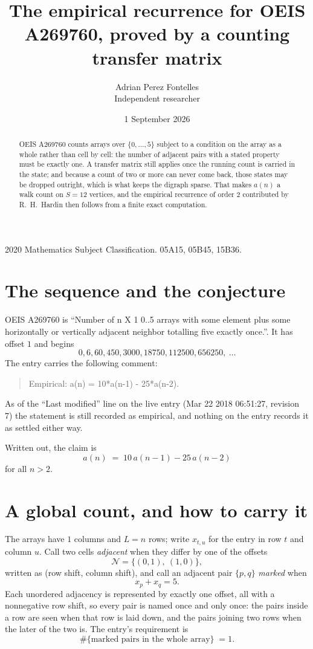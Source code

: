 \documentclass[11pt,a4paper]{article}
\title{The empirical recurrence for OEIS A269760, proved by a counting transfer matrix}
\author{Adrian Perez Fontelles\\ \small Independent researcher}
\date{1 September 2026}
\theoremstyle{plain}
\theoremstyle{definition}
\begin{document}
\maketitle

\begin{abstract}
OEIS A269760 counts arrays over $\{0,\dots,5\}$ subject to a condition on the array as a
whole rather than cell by cell: the number of adjacent pairs with a stated property must be
exactly one. A transfer matrix still applies once the running count is carried in the state; and
because a count of two or more can never come back, those states may be dropped outright,
which is what keeps the digraph sparse. That makes $a(n)$ a walk count on $S=12$ vertices,
and the empirical recurrence of order $2$ contributed by R.~H.~Hardin then follows from
a finite exact computation.
\end{abstract}

\noindent\small 2020 Mathematics Subject Classification. 05A15, 05B45, 15B36.\normalsize

\section{The sequence and the conjecture}

OEIS A269760 is ``Number of n X 1 0..5 arrays with some element plus some horizontally or vertically adjacent neighbor totalling five exactly once.''. It has offset $1$ and begins
\[
0, 6, 60, 450, 3000, 18750, 112500, 656250,\ \dots
\]
The entry carries the following comment:
\begin{quote}\small
Empirical: a(n) = 10*a(n-1) - 25*a(n-2).
\end{quote}
As of the ``Last modified'' line on the live entry (Mar 22 2018 06:51:27, revision 7) the statement is
still recorded as empirical, and nothing on the entry records it as settled either way.

Written out, the claim is
\begin{equation}\label{eq:conj}
a(n)\;=\;10\,a(n-1) - 25\,a(n-2)
\end{equation}
for all $n>2$.

\section{A global count, and how to carry it}

The arrays have $1$ columns and $L=n$ rows; write $x_{t,u}$ for the entry in
row $t$ and column $u$. Call two cells \emph{adjacent} when they differ by one of the
offsets
\[
\mathcal N=\{(0,1),\ (1,0)\},
\]
written as (row shift, column shift), and call an adjacent pair $\{p,q\}$
\emph{marked} when
\[
x_{p}+x_{q}=5 .
\]
Each unordered adjacency is represented by exactly one offset, all with a nonnegative row
shift, so every pair is named once and only once: the pairs inside a row are seen when
that row is laid down, and the pairs joining two rows when the later of the two is. The
entry's requirement is
\begin{equation}\label{eq:glob}
\#\{\text{marked pairs in the whole array}\}\;=1.
\end{equation}
\end{document}
